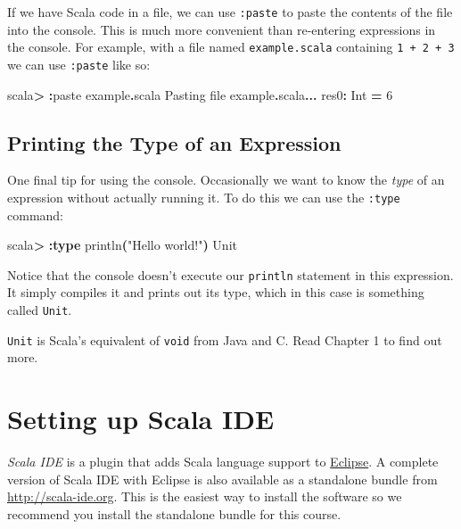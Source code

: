 \documentclass[11pt,a5paper,]{book}
\newenvironment{Shaded}{\begin{snugshade}}{\end{snugshade}}
\newcommand{\BuiltInTok}[1]{#1}
\newcommand{\DecValTok}[1]{\textcolor[rgb]{0.00,0.00,0.81}{#1}}
\newcommand{\FunctionTok}[1]{\textcolor[rgb]{0.00,0.00,0.00}{#1}}
\newcommand{\KeywordTok}[1]{\textcolor[rgb]{0.13,0.29,0.53}{\textbf{#1}}}
\newcommand{\NormalTok}[1]{#1}
\newcommand{\OperatorTok}[1]{\textcolor[rgb]{0.81,0.36,0.00}{\textbf{#1}}}
\newcommand{\StringTok}[1]{\textcolor[rgb]{0.31,0.60,0.02}{#1}}
\begin{document}
If we have Scala code in a file, we can use \texttt{:paste} to paste the
contents of the file into the console. This is much more convenient than
re-entering expressions in the console. For example, with a file named
\texttt{example.scala} containing \texttt{1\ +\ 2\ +\ 3} we can use
\texttt{:paste} like so:

\begin{Shaded}
\begin{Highlighting}[]
\NormalTok{scala}\OperatorTok{\textgreater{}} \OperatorTok{:}\NormalTok{paste example}\OperatorTok{.}\NormalTok{scala}
\NormalTok{Pasting file example}\OperatorTok{.}\NormalTok{scala}\OperatorTok{...}
\NormalTok{res0}\OperatorTok{:} \BuiltInTok{Int} \OperatorTok{=} \DecValTok{6}
\end{Highlighting}
\end{Shaded}

\hypertarget{printing-the-type-of-an-expression}{%
\subsection{Printing the Type of an
Expression}\label{printing-the-type-of-an-expression}}

One final tip for using the console. Occasionally we want to know the
\emph{type} of an expression without actually running it. To do this we
can use the \texttt{:type} command:

\begin{Shaded}
\begin{Highlighting}[]
\NormalTok{scala}\OperatorTok{\textgreater{}} \OperatorTok{:}\KeywordTok{type} \FunctionTok{println}\OperatorTok{(}\StringTok{"Hello world!"}\OperatorTok{)}
\BuiltInTok{Unit}
\end{Highlighting}
\end{Shaded}

Notice that the console doesn't execute our \texttt{println} statement
in this expression. It simply compiles it and prints out its type, which
in this case is something called \texttt{Unit}.

\texttt{Unit} is Scala's equivalent of \texttt{void} from Java and C.
Read Chapter 1 to find out more.

\hypertarget{setting-up-scala-ide}{%
\section{Setting up Scala IDE}\label{setting-up-scala-ide}}

\emph{Scala IDE} is a plugin that adds Scala language support to
\href{http://eclipse.org}{Eclipse}. A complete version of Scala IDE with
Eclipse is also available as a standalone bundle from
\href{}{http://scala-ide.org}. This is the easiest way to install the
software so we recommend you install the standalone bundle for this
course.
\end{document}
